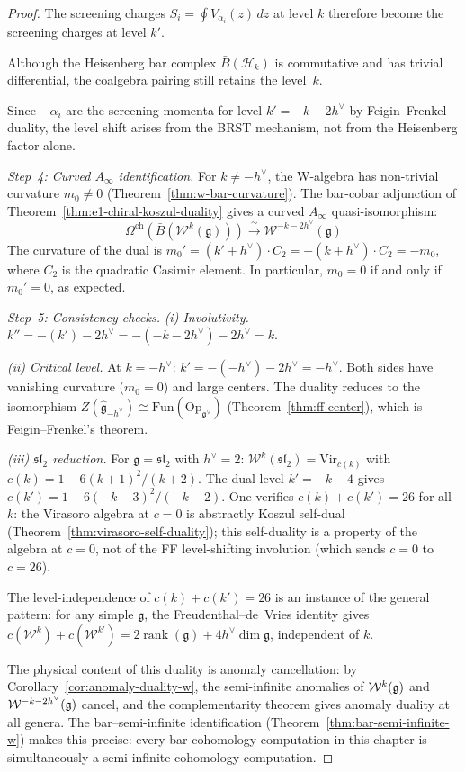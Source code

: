 \begin{proof}
The screening charges $S_i = \oint V_{\alpha_i}(z)\,dz$ at level $k$
therefore become the screening charges at level $k'$.

Although the Heisenberg bar complex $\bar{B}(\mathcal{H}_k)$ is
commutative and has trivial differential, the coalgebra pairing still
retains the level~$k$.

Since $-\alpha_i$ are the screening momenta for level
$k' = -k-2h^\vee$ by Feigin--Frenkel duality, the level shift arises
from the BRST mechanism, not from the Heisenberg factor alone.

\emph{Step~4: Curved $A_\infty$ identification.}
For $k \neq -h^\vee$, the W-algebra has non-trivial curvature $m_0 \neq 0$ (Theorem~\ref{thm:w-bar-curvature}). The bar-cobar adjunction of Theorem~\ref{thm:e1-chiral-koszul-duality} gives a curved $A_\infty$ quasi-isomorphism:
\[
\Omega^{\mathrm{ch}}(\bar{B}(\mathcal{W}^k(\mathfrak{g}))) \xrightarrow{\;\sim\;} \mathcal{W}^{-k-2h^\vee}(\mathfrak{g})
\]
The curvature of the dual is $m_0' = (k' + h^\vee) \cdot C_2 = -(k + h^\vee) \cdot C_2 = -m_0$, where $C_2$ is the quadratic Casimir element.  In particular, $m_0 = 0$ if and only if $m_0' = 0$, as expected.

\emph{Step~5: Consistency checks.}
\emph{(i) Involutivity.}  $k'' = -(k') - 2h^\vee = -(-k-2h^\vee) - 2h^\vee = k$. \checkmark

\emph{(ii) Critical level.}  At $k = -h^\vee$: $k' = -(-h^\vee) - 2h^\vee = -h^\vee$. Both sides have vanishing curvature ($m_0 = 0$) and large centers.  The duality reduces to the isomorphism $Z(\widehat{\mathfrak{g}}_{-h^\vee}) \cong \mathrm{Fun}(\mathrm{Op}_{\mathfrak{g}^\vee})$ (Theorem~\ref{thm:ff-center}), which is Feigin--Frenkel's theorem. \checkmark

\emph{(iii) $\mathfrak{sl}_2$ reduction.}  For $\mathfrak{g} = \mathfrak{sl}_2$ with $h^\vee = 2$: $\mathcal{W}^k(\mathfrak{sl}_2) = \mathrm{Vir}_{c(k)}$ with $c(k) = 1 - 6(k+1)^2/(k+2)$.  The dual level $k' = -k-4$ gives $c(k') = 1 - 6(-k-3)^2/(-k-2)$.  One verifies $c(k) + c(k') = 26$ for all $k$: the Virasoro algebra at $c = 0$ is abstractly Koszul self-dual (Theorem~\ref{thm:virasoro-self-duality}); this self-duality is a property of the algebra at $c=0$, not of the FF level-shifting involution (which sends $c=0$ to $c=26$). \checkmark

The level-independence of $c(k) + c(k') = 26$ is an instance of the
general pattern: for any simple $\mathfrak{g}$, the Freudenthal--de~Vries
identity gives $c(\mathcal{W}^k) + c(\mathcal{W}^{k'})
= 2\operatorname{rank}(\mathfrak{g}) + 4h^\vee\dim\mathfrak{g}$,
independent of $k$.

The physical content of this duality is anomaly cancellation:
by Corollary~\ref{cor:anomaly-duality-w}, the semi-infinite
anomalies of $\mathcal{W}^k(\mathfrak{g})$ and $\mathcal{W}^{-k-2h^\vee}(\mathfrak{g})$
cancel, and the complementarity theorem gives anomaly duality at
all genera.  The bar--semi-infinite identification
(Theorem~\ref{thm:bar-semi-infinite-w}) makes this precise: every
bar cohomology computation in this chapter is simultaneously a
semi-infinite cohomology computation.
\end{proof}

